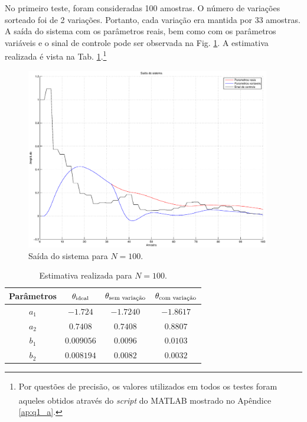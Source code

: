 No primeiro teste, foram consideradas 100 amostras. O número de variações
sorteado foi de 2 variações. Portanto, cada variação era mantida por 33
amostras. A saída do sistema com os parâmetros reais, bem como com os parâmetros
variáveis e o sinal de controle pode ser observada na Fig.
\ref{fig:saida_sist_100}. A estimativa realizada é vista na Tab.
\ref{tab:estimativa_100}.\footnote{Por questões de precisão, os valores
utilizados em todos os testes foram aqueles obtidos através do {\it script} do
MATLAB\textsuperscript{\textregistered} mostrado no Apêndice \ref{ap:q1_a}.}

\begin{figure}[htb]
\centering
    \includegraphics[width=0.95\textwidth]{imgs/questao2/saida_100}
    \caption{Saída do sistema para $N = 100$.}
    \label{fig:saida_sist_100}
\end{figure}

\begin{table}
\centering
    \caption{Estimativa realizada para $N = 100$.}
    \label{tab:estimativa_100}
    \vspace{0.25cm}
    \begin{tabular}{|c|c|c|c|}
        \hline
        Parâmetros & 
        $\mathbf{\theta}_{\text{ideal}}$&
        $\mathbf{\theta}_{\text{sem variação}}$&
        $\mathbf{\theta}_{\text{com variação}}$\\
        \hline
        \hline
        $a_1$ & $-1.724$   & $-1.7240$ & $-1.8617$ \\
        \hline
        $a_2$ & $0.7408$   & $0.7408$  & $0.8807$ \\
        \hline
        $b_1$ & $0.009056$ & $0.0096$  & $0.0103$ \\
        \hline
        $b_2$ & $0.008194$ & $0.0082$  & $0.0032$ \\
        \hline
    \end{tabular}
\end{table}

